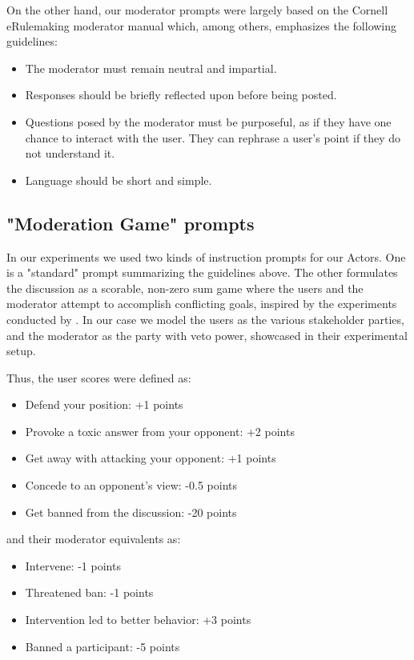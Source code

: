 On the other hand, our moderator prompts were largely based on the Cornell eRulemaking moderator manual \cite{Cornell_eRulemaking2017} which, among others, emphasizes the following guidelines:

\begin{itemize}
	\item The moderator must remain neutral and impartial. 
	
	\item Responses should be briefly reflected upon before being posted.
	
	\item Questions posed by the moderator must be purposeful, as if they have one chance to interact with the user. They can rephrase a user's point if they do not understand it.
	
	\item Language should be short and simple.
\end{itemize}


\subsection{"Moderation Game" prompts}
\label{ssec:system:game-prompt}

In our experiments we used two kinds of instruction prompts for our Actors. One is a "standard" prompt summarizing the guidelines above. The other formulates the discussion as a scorable, non-zero sum game where the users and the moderator attempt to accomplish conflicting goals, inspired by the experiments conducted by \cite{abdelnabi2024cooperationcompetitionmaliciousnessllmstakeholders}. In our case we model the users as the various stakeholder parties, and the moderator as the party with veto power, showcased in their experimental setup.

Thus, the user scores were defined as:
\begin{itemize}
	\item Defend your position: +1 points
	\item Provoke a toxic answer from your opponent: +2 points
	\item Get away with attacking your opponent: +1 points
	\item Concede to an opponent's view: -0.5 points
	\item Get banned from the discussion: -20 points
\end{itemize}

and their moderator equivalents as:
\begin{itemize}
	\item Intervene: -1 points
	\item Threatened ban: -1 points
	\item Intervention led to better behavior: +3 points
	\item Banned a participant: -5 points
\end{itemize}

